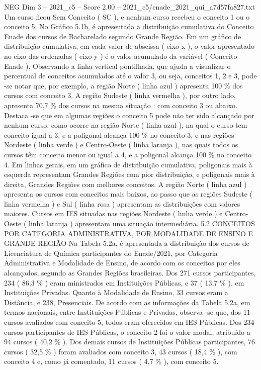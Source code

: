 \begin{textsample}{NEG Dim 3 – 2021\_c5 – Score 2.00 – 2021\_c5/enade\_2021\_qui\_a7d57fa827.txt}
Um curso ficou Sem Conceito ( SC ), e nenhum curso recebeu o conceito 1 ou o conceito 5.
No Gráfico 5.1b, é apresentada a distribuição cumulativa do Conceito Enade dos cursos de Bacharelado segundo Grande Região.
Em um gráfico de distribuição cumulativa, em cada valor de abscissa ( eixo x ), o valor apresentado no eixo das ordenadas ( eixo y ) é o valor acumulado da variável ( Conceito Enade ).
Observando a linha vertical pontilhada, que ajuda a visualizar o percentual de conceitos acumulados até o valor 3, ou seja, conceitos 1, 2 e 3, pode -se notar que, por exemplo, a região Norte ( linha azul ) apresenta 100 \% dos cursos com conceito 3.
A região Sudeste ( linha vermelha ), por outro lado, apresenta 70,7 \% dos cursos na mesma situação : com conceito 3 ou abaixo.
Destaca -se que em algumas regiões o conceito 5 pode não ter sido alcançado por nenhum curso, como ocorre na região Norte ( linha azul ), na qual o curso tem conceito igual a 3, e a poligonal alcança 100 \% no conceito 3, e nas regiões Nordeste ( linha verde ) e Centro-Oeste ( linha laranja ), nas quais todos os cursos têm conceito menor ou igual a 4, e a poligonal alcança 100 \% no conceito 4.
Em linhas gerais, em um gráfico de distribuição cumulativa, poligonais mais à esquerda representam Grandes Regiões com pior distribuição, e poligonais mais à direita, Grandes Regiões com melhores conceitos.
A região Norte ( linha azul ) apresenta os cursos com conceitos mais baixos, ao passo que as regiões Sudeste ( linha vermelha ) e Sul ( linha rosa ) apresentam as distribuições com valores maiores.
Cursos em IES situadas nas regiões Nordeste ( linha verde ) e Centro-Oeste ( linha laranja ) apresentam uma situação intermediária. 5.2 CONCEITOS POR CATEGORIA ADMINISTRATIVA, POR MODALIDADE DE ENSINO E GRANDE REGIÃO Na Tabela 5.2a, é apresentada a distribuição dos cursos de Licenciatura de Química participantes do Enade/2021, por Categoria Administrativa e Modalidade de Ensino, de acordo com os conceitos por eles alcançados, segundo as Grandes Regiões brasileiras.
Dos 271 cursos participantes, 234 ( 86,3 \% ) eram ministrados em Instituições Públicas, e 37 ( 13,7 \% ), em Instituições Privadas.
Quanto à Modalidade de Ensino, 33 cursos eram a Distância, e 238, Presenciais.
De acordo com as informações da Tabela 5.2a, em termos nacionais, entre Instituições Públicas e Privadas, observa -se que, dos 11 cursos avaliados com conceito 5, todos eram oferecidos em IES Públicas.
Dos 234 cursos participantes de IES Públicas, o conceito 2 foi o valor modal, atribuído a 94 cursos ( 40,2 \% ).
Dos demais cursos de Instituições Públicas participantes, 76 cursos ( 32,5 \% ) foram avaliados com conceito 3, 43 cursos ( 18,4 \% ), com conceito 4 e, como já comentado, 11 cursos ( 4,7 \% ), com conceito 5.

\end{textsample}
